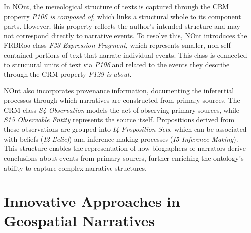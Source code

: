 In NOnt, the mereological structure of texts is captured through the CRM property \textit{P106 is composed of}, which links a structural whole to its component parts. However, this property reflects the author's intended structure and may not correspond directly to narrative events. To resolve this, NOnt introduces the FRBRoo class \textit{F23 Expression Fragment}, which represents smaller, non-self-contained portions of text that narrate individual events. This class is connected to structural units of text via \textit{P106} and related to the events they describe through the CRM property \textit{P129 is about}.

NOnt also incorporates provenance information, documenting the inferential processes through which narratives are constructed from primary sources. The CRM class \textit{S4 Observation} models the act of observing primary sources, while \textit{S15 Observable Entity} represents the source itself. Propositions derived from these observations are grouped into \textit{I4 Proposition Sets}, which can be associated with beliefs (\textit{I2 Belief}) and inference-making processes (\textit{I5 Inference Making}). This structure enables the representation of how biographers or narrators derive conclusions about events from primary sources, further enriching the ontology's ability to capture complex narrative structures.


\section{Innovative Approaches in Geospatial Narratives}\label{III-sec:innovative_approaches}

